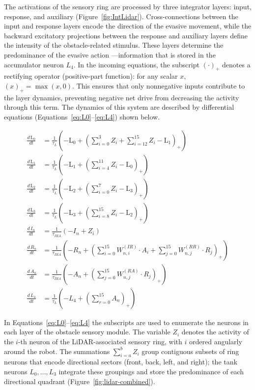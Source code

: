\documentclass[preprint,12pt]{elsarticle}
\begin{document}
The activations of the sensory ring are processed by three integrator layers: input, response, and auxiliary (Figure~\ref{fig:IntLidar}). Cross-connections between the input and response layers encode the direction of the evasive movement, while the backward excitatory projections between the response and auxiliary layers define the intensity of the obstacle-related stimulus. These layers determine the predominance of the evasive action ---information that is stored in the accumulator neuron $L_4$. In the incoming equations, the subscript $(\cdot)_+$ denotes a rectifying operator (positive-part function): for any scalar $x$, $(x)_+ = \max(x,0)$. This ensures that only nonnegative inputs contribute to the layer dynamics, preventing negative net drive from decreasing the activity through this term. The dynamics of this system are described by differential equations (Equations~\eqref{eq:L0}–\eqref{eq:L4}) shown below. 

\begin{align}
\frac{d\, \text{L}_0}{dt} &= \frac{1}{\tau_{L}} \left( -\text{L}_0 + \left( \sum_{i=0}^{3} Z_i + \sum_{i=12}^{15} Z_i - \text{L}_1 \right)_+ \right)\label{eq:L0}\\
\frac{d\, \text{L}_1}{dt} &= \frac{1}{\tau_{L}} \left( -\text{L}_1 + \left( \sum_{i=4}^{11} Z_i - \text{L}_0 \right)_+ \right)\label{eq:L1}\\
\frac{d\, \text{L}_2}{dt} &= \frac{1}{\tau_{L}} \left( -\text{L}_2 + \left( \sum_{i=0}^{7} Z_i - \text{L}_3 \right)_+ \right)\label{eq:L2}\\
\frac{d\, \text{L}_3}{dt} &= \frac{1}{\tau_{L}} \left( -\text{L}_3 + \left( \sum_{i=8}^{15} Z_i - \text{L}_2 \right)_+ \right)\label{eq:L3}\\
\frac{d\, I_n}{dt} &= \frac{1}{\tau_{IRA}} \left( -I_n + Z_i \right)\label{eq:InputL}\\
\frac{d\, R_n}{dt} &= \frac{1}{\tau_{IRA}} \left( -R_n + \left(\sum_{i=0}^{15} W^{(IR)}_{n,i} \cdot A_i + \sum_{j=0}^{15} W^{(RR)}_{n,j} \cdot R_j \right)_+\right)\label{eq:ResL}\\
\frac{d\, A_n}{dt} &= \frac{1}{\tau_{IRA}} \left( -A_n + \left(\sum_{j=0}^{15} W^{(RA)}_{n,j} \cdot R_j \right)_+ \right)\label{eq:AuxL}\\
\frac{d\, L_4}{dt} &= \frac{1}{\tau_L} \left( -L_4 + \left(\sum_{r=0}^{15} A_n \right) _+\right)\label{eq:L4}
\end{align}

In Equations~\eqref{eq:L0}–\eqref{eq:L4} the subscripts are used to enumerate the neurons in each layer of the obstacle sensory module. The variable $Z_i$ denotes the activity of the $i$-th neuron of the LiDAR-associated sensory ring, with $i$ ordered angularly around the robot. The summations $\sum_{i=a}^{b} Z_i$ group contiguous subsets of ring neurons that encode directional sectors (front, back, left, and right); the tank neurons $L_0,\dots,L_3$ integrate these groupings and store the predominance of each directional quadrant (Figure~\ref{fig:lidar-combined}).
\end{document}
